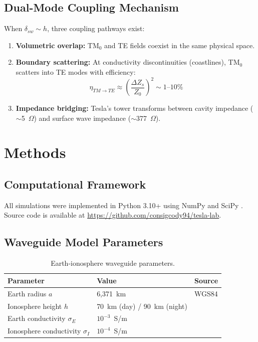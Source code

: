 \documentclass[12pt,a4paper]{article}
\begin{document}
\subsection{Dual-Mode Coupling Mechanism}

When $\delta_{sw} \sim h$, three coupling pathways exist:
\begin{enumerate}
    \item \textbf{Volumetric overlap:} TM$_0$ and TE fields coexist in the same physical space.
    \item \textbf{Boundary scattering:} At conductivity discontinuities (coastlines), TM$_0$ scatters into TE modes with efficiency:
    \begin{equation}
        \eta_{TM \to TE} \approx \left(\frac{\Delta Z_s}{Z_0}\right)^2 \sim 1\text{--}10\%
        \label{eq:conversion}
    \end{equation}
    \item \textbf{Impedance bridging:} Tesla's tower transforms between cavity impedance ($\sim$5~$\Omega$) and surface wave impedance ($\sim$377~$\Omega$).
\end{enumerate}

\section{Methods}

\subsection{Computational Framework}

All simulations were implemented in Python 3.10+ using NumPy \citep{harris2020} and SciPy \citep{virtanen2020}. Source code is available at \url{https://github.com/consigcody94/tesla-lab}.

\subsection{Waveguide Model Parameters}

\begin{table}[H]
\centering
\caption{Earth-ionosphere waveguide parameters.}
\begin{tabular}{lll}
\toprule
Parameter & Value & Source \\
\midrule
Earth radius $a$ & 6,371~km & WGS84 \\
Ionosphere height $h$ & 70~km (day) / 90~km (night) & \citep{wait1962} \\
Earth conductivity $\sigma_E$ & $10^{-3}$~S/m & \citep{wait1962} \\
Ionosphere conductivity $\sigma_I$ & $10^{-4}$~S/m & \citep{galejs1972} \\
\bottomrule
\end{tabular}
\end{table}
\end{document}
